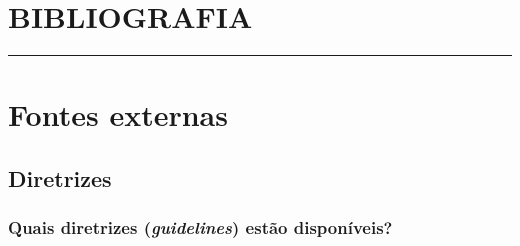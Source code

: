 \documentclass[
  a4paper,
]{book}
\begin{document}

\hypertarget{bibliografia}{%
\chapter*{\texorpdfstring{\textbf{BIBLIOGRAFIA}}{BIBLIOGRAFIA}}\label{bibliografia}}

\markboth{}{}
\par\noindent\rule{\textwidth}{0.05in}

\hypertarget{fontes-externas}{%
\chapter*{\texorpdfstring{\textbf{Fontes externas}}{Fontes externas}}\label{fontes-externas}}

\hypertarget{diretrizes}{%
\section{Diretrizes}\label{diretrizes}}

\hypertarget{quais-diretrizes-guidelines-estuxe3o-disponuxedveis}{%
\subsection{\texorpdfstring{Quais diretrizes (\emph{guidelines}) estão disponíveis?}{Quais diretrizes (guidelines) estão disponíveis?}}\label{quais-diretrizes-guidelines-estuxe3o-disponuxedveis}}
\end{document}
